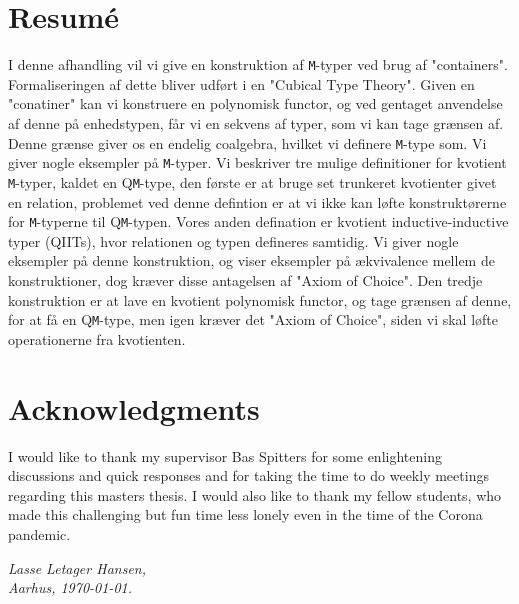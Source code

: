 \documentclass[twoside,11pt,openright]{report}
\theoremstyle{plain} %
\theoremstyle{definition}
\theoremstyle{remark}
\begin{document}
\chapter*{Resum\'e}

I denne afhandling vil vi give en konstruktion af \texttt{M}-typer ved brug af "containers". Formaliseringen af dette bliver udført i en "Cubical Type Theory". Given en "conatiner" kan vi konstruere en polynomisk functor, og ved gentaget anvendelse af denne på enhedstypen, får vi en sekvens af typer, som vi kan tage grænsen af. Denne grænse giver os en endelig coalgebra, hvilket vi definere \texttt{M}-type som. Vi giver nogle eksempler på \texttt{M}-typer. Vi beskriver tre mulige definitioner for kvotient \texttt{M}-typer, kaldet en Q\texttt{M}-type, den første er at bruge set trunkeret kvotienter givet en relation, problemet ved denne defintion er at vi ikke kan løfte konstruktørerne for \texttt{M}-typerne til Q\texttt{M}-typen. Vores anden defination er kvotient inductive-inductive typer (QIITs), hvor relationen og typen defineres samtidig. Vi giver nogle eksempler på denne konstruktion, og viser eksempler på ækvivalence mellem de konstruktioner, dog kræver disse antagelsen af "Axiom of Choice". Den tredje konstruktion er at lave en kvotient polynomisk functor, og tage grænsen af denne, for at få en Q\texttt{M}-type, men igen kræver det "Axiom of Choice", siden vi skal løfte operationerne fra kvotienten. 

\chapter*{Acknowledgments}
I would like to thank my supervisor Bas Spitters for some enlightening discussions and quick responses and for taking the time to do weekly meetings regarding this masters thesis. I would also like to thank my fellow students, who made this challenging but fun time less lonely even in the time of the Corona pandemic.
\vspace{2ex}
\begin{flushright}
  \emph{Lasse Letager Hansen,}\\
  \emph{Aarhus, \today.}
\end{flushright}

\tableofcontents
\cleardoublepage
{}
\setcounter{secnumdepth}{3} %

\end{document}
